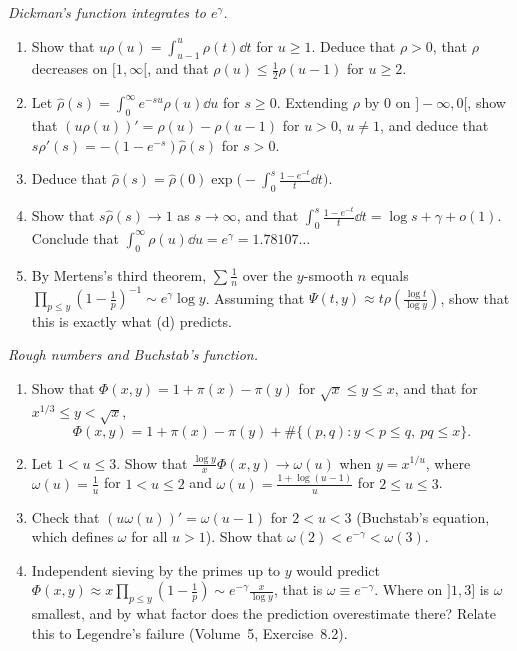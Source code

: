 \begin{exercise}[$\star\star\star$]\label{pb:dickmanint}
\emph{Dickman's function integrates to $e^\gamma$.}
\begin{enumerate}[label=(\alph*)]
\item Show that $u\rho(u)=\int_{u-1}^u\rho(t)\dd t$ for $u\ge1$. Deduce that $\rho>0$, that $\rho$ decreases on $[1,\infty[$, and that $\rho(u)\le\frac12\rho(u-1)$ for $u\ge2$.
\item Let $\hat\rho(s)=\int_0^\infty e^{-su}\rho(u)\dd u$ for $s\ge0$. Extending $\rho$ by $0$ on $]-\infty,0[$, show that $(u\rho(u))'=\rho(u)-\rho(u-1)$ for $u>0$, $u\ne1$, and deduce
that $s\hat\rho'(s)=-(1-e^{-s})\hat\rho(s)$ for $s>0$.
\item Deduce that $\hat\rho(s)=\hat\rho(0)\exp\bigl(-\int_0^s\frac{1-e^{-t}}t\dd t\bigr)$.
\item Show that $s\hat\rho(s)\to1$ as $s\to\infty$, and that $\int_0^s\frac{1-e^{-t}}t\dd t=\log s+\gamma+o(1)$. Conclude that $\int_0^\infty\rho(u)\dd u=e^\gamma=1.78107\ldots$
\item By Mertens's third theorem, $\sum\frac1n$ over the $y$-smooth $n$ equals $\prod_{p\le y}(1-\frac1p)^{-1}\sim e^\gamma\log y$. Assuming that $\Psi(t,y)\approx t\rho(\frac{\log t}{\log y})$,
show that this is exactly what (d) predicts.
\end{enumerate}
\end{exercise}

\begin{exercise}[$\star\star\star$]\label{pb:buchstab}
\emph{Rough numbers and Buchstab's function.}
\begin{enumerate}[label=(\alph*)]
\item Show that $\Phi(x,y)=1+\pi(x)-\pi(y)$ for $\sqrt x\le y\le x$, and that for $x^{1/3}\le y<\sqrt x$,
\[
\Phi(x,y)=1+\pi(x)-\pi(y)+\#\{(p,q):y<p\le q,\ pq\le x\}.
\]
\item Let $1<u\le3$. Show that $\frac{\log y}x\Phi(x,y)\to\omega(u)$ when $y=x^{1/u}$, where $\omega(u)=\frac1u$ for $1<u\le2$ and $\omega(u)=\frac{1+\log(u-1)}u$ for $2\le u\le3$.
\item Check that $(u\omega(u))'=\omega(u-1)$ for $2<u<3$ (Buchstab's equation, which defines $\omega$ for all $u>1$). Show that $\omega(2)<e^{-\gamma}<\omega(3)$.
\item Independent sieving by the primes up to $y$ would predict $\Phi(x,y)\approx x\prod_{p\le y}(1-\frac1p)\sim e^{-\gamma}\frac x{\log y}$, that is $\omega\equiv e^{-\gamma}$. Where on $]1,3]$ is $\omega$ smallest, and by what factor
does the prediction overestimate there? Relate this to Legendre's failure (Volume~5, Exercise~8.2).
\end{enumerate}
\end{exercise}


